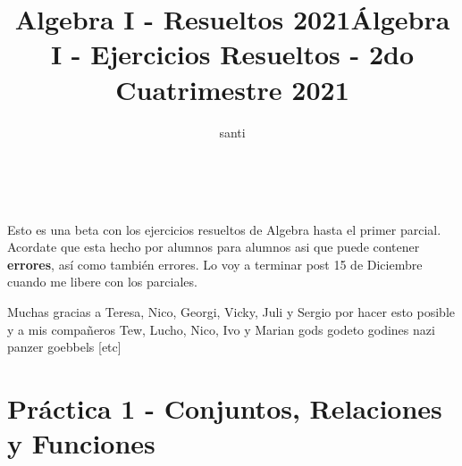 \documentclass[a4paper,11pt]{article}
\title{Algebra I - Resueltos 2021}
\begin{document}
\makeatletter
\renewcommand{\maketitle}{
\begin{center}
\begin{normalsize}\textbf{\@title}\end{normalsize}\\
\begin{normalsize}\@author\end{normalsize}
\end{center}
}
\title{Álgebra I - Ejercicios Resueltos - 2do Cuatrimestre 2021} 
\author{santi}
\maketitle

Esto es una beta con los ejercicios resueltos de Algebra hasta el primer parcial. Acordate que esta hecho por alumnos para alumnos asi que puede contener \textbf{errores}, así como también errores. Lo voy a terminar post 15 de Diciembre cuando me libere con los parciales. 

Muchas gracias a Teresa, Nico, Georgi, Vicky, Juli y Sergio por hacer esto posible y a mis compañeros Tew, Lucho, Nico, Ivo y Marian gods godeto godines nazi panzer goebbels [etc]

\section{Práctica 1 - Conjuntos, Relaciones y Funciones}
\end{document}
